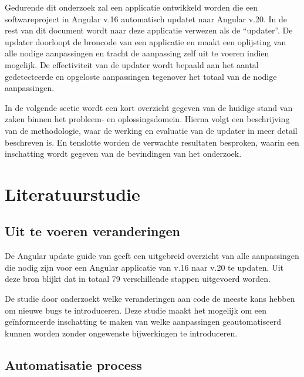 Gedurende dit onderzoek zal een applicatie ontwikkeld worden die een softwareproject in Angular v.16 automatisch updatet naar Angular v.20.
In de rest van dit document wordt naar deze applicatie verwezen als de ``updater''.
De updater doorloopt de broncode van een applicatie en maakt een oplijsting van alle nodige aanpassingen en tracht de aanpassing zelf uit te voeren indien mogelijk.
De effectiviteit van de updater wordt bepaald aan het aantal gedetecteerde en opgeloste aanpassingen tegenover het totaal van de nodige aanpassingen.

In de volgende sectie wordt een kort overzicht gegeven van de huidige stand van zaken binnen het probleem- en oplossingsdomein.
Hierna volgt een beschrijving van de methodologie, waar de werking en evaluatie van de updater in meer detail beschreven is.
En tenslotte worden de verwachte resultaten besproken, waarin een inschatting wordt gegeven van de bevindingen van het onderzoek.

\section{Literatuurstudie}
\label{sec:literatuurstudie}

\subsection{Uit te voeren veranderingen}

De Angular update guide van \textcite{AngularUpdateGuide2025} geeft een uitgebreid overzicht van alle aanpassingen die nodig zijn voor een Angular applicatie van v.16 naar v.20 te updaten. 
Uit deze bron blijkt dat in totaal 79 verschillende stappen uitgevoerd worden.

De studie door \textcite{Di2020} onderzoekt welke veranderingen aan code de meeste kans hebben om nieuwe bugs te introduceren.
Deze studie maakt het mogelijk om een geïnformeerde inschatting te maken van welke aanpassingen geautomatiseerd kunnen worden zonder ongewenste bijwerkingen te introduceren.

\subsection{Automatisatie process}

